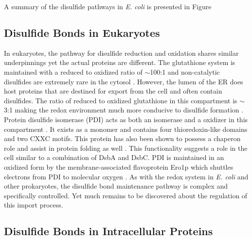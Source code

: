 A summary of the disulfide pathways in \emph{E. coli} is presented in Figure

\subsection{Disulfide Bonds in Eukaryotes}

In eukaryotes, the pathway for disulfide reduction and oxidation shares similar
underpinnings yet the actual proteins are different.  The glutathione system is
maintained with a reduced to oxidized ratio of $\sim$100:1 and non-catalytic
disulfides are extremely rare in the cytosol \cite{95}.  However, the lumen of
the ER does host proteins that are destined for export from the cell and often
contain disulfides.  The ratio of reduced to oxidized glutathione in this
compartment is $\sim$3:1 making the redox environment much more conducive to
disulfide formation \cite{95}.  Protein disulfide isomerase (PDI) acts as both
an isomerase and a oxidizer in this compartment \cite{96,99}.  It exists as a
monomer and contains four thioredoxin-like domains and two CXXC motifs.  This
protein has also been shown to possess a chaperon role and assist in protein
folding as well \cite{97}.  This functionality suggests a role in the cell
similar to a combination of DsbA and DsbC.  PDI is maintained in an oxidized
form by the membrane-associated flavoprotein Ero1p \cite{102,103} which
shuttles electrons from PDI to molecular oxygen \cite{105,108}.  As with the
redox system in \emph{E. coli} and other prokaryotes, the disulfide bond
maintenance pathway is complex and specifically controlled.  Yet much remains
to be discovered about the regulation of this import process.

\subsection{Disulfide Bonds in Intracellular Proteins}

